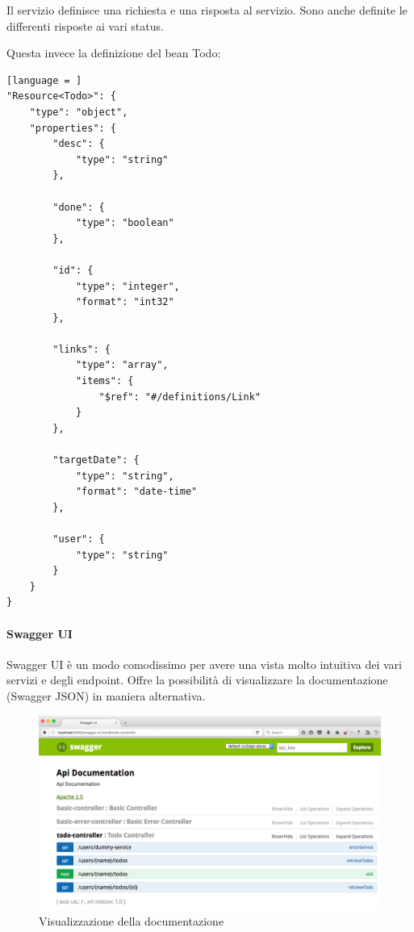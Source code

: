 \documentclass[11pt,a4paper]{book}
\begin{document}
Il servizio definisce una richiesta e una risposta al servizio. Sono anche definite le differenti risposte ai vari status.

Questa invece la definizione del bean Todo:
\begin{lstlisting}[language = ]
"Resource<Todo>": {
	"type": "object",
	"properties": {
		"desc": {
			"type": "string"
		},
	
		"done": {
			"type": "boolean"
		},
		
		"id": {
			"type": "integer",
			"format": "int32"
		},
	
		"links": {
			"type": "array",
			"items": {
				"$ref": "#/definitions/Link"
			}
		},
	
		"targetDate": {
			"type": "string",
			"format": "date-time"
		},
		
		"user": {
			"type": "string"
		}
	}
}
\end{lstlisting}

\paragraph{Swagger UI}
Swagger UI è un modo comodissimo per avere una vista molto intuitiva dei vari servizi e degli endpoint. Offre la possibilità di visualizzare la documentazione (Swagger JSON) in maniera alternativa.

\begin{figure}[h!]
	\begin{center}
		\includegraphics[scale=0.4]{img/004.png}
		\caption{Visualizzazione della documentazione}
		\label{fig: 004}
	\end{center}
\end{figure}
\end{document}
